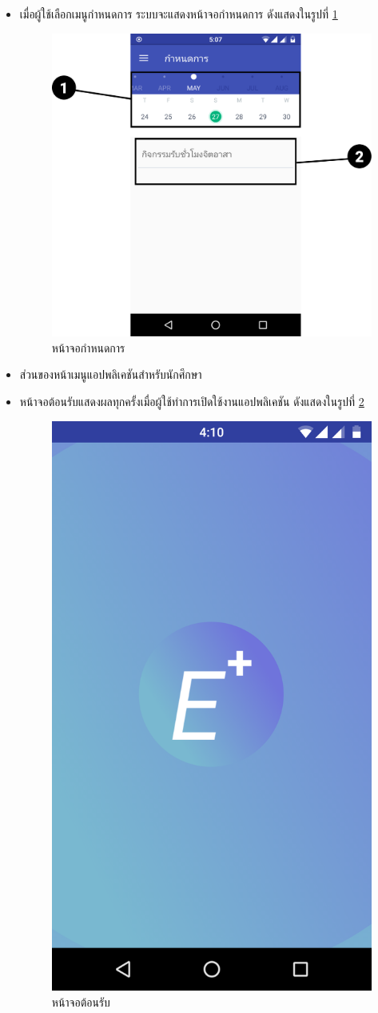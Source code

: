 \begin{enumerate}
\begin{itemize}
			\item เมื่อผู้ใช้เลือกเมนูกำหนดการ ระบบจะแสดงหน้าจอกำหนดการ ดังแสดงในรูปที่ \ref{Fig:event}
			\begin{figure}[H]
				\centering
				\includegraphics[width=0.5\columnwidth]{Figures/7/Manual/event}
				\caption{หน้าจอกำหนดการ}
				\label{Fig:event}
			\end{figure}	\item ส่วนของหน้าเมนูแอปพลิเคชันสำหรับนักศึกษา

		\item หน้าจอต้อนรับแสดงผลทุกครั้งเมื่อผู้ใช้ทำการเปิดใช้งานแอปพลิเคชัน ดังแสดงในรูปที่ \ref{Fig:open}
		\begin{figure}[H]
			\centering
			\includegraphics[width=0.3\columnwidth]{Figures/7/Manual/open}
			\caption{หน้าจอต้อนรับ}
			\label{Fig:open}
		\end{figure}
		

\end{itemize}
\end{enumerate}
